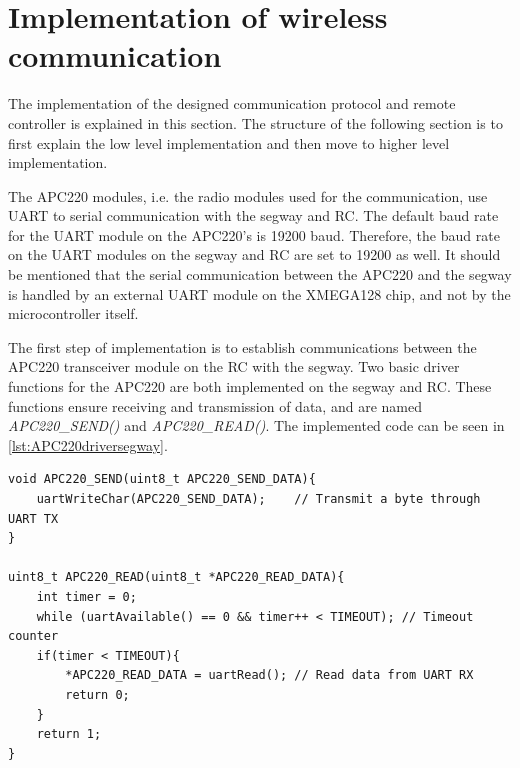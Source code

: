 %
\newpage
\section{Implementation of wireless communication}
The implementation of the designed communication protocol and remote controller is explained in this section. The structure of the following section is to first explain the low level implementation and then move to higher level implementation.%
 
The APC220 modules, i.e. the radio modules used for the communication, use UART to serial communication with the segway and RC. The default baud rate for the UART module on the APC220's is 19200 baud. Therefore, the baud rate on the UART modules on the segway and RC are set to 19200 as well. It should be mentioned that the serial communication between the APC220 and the segway is handled by an external UART module on the XMEGA128 chip, and not by the microcontroller itself. 

The first step of implementation is to establish communications between the APC220 transceiver module on the RC with the segway. Two basic driver functions for the APC220 are both implemented on the segway and RC. These functions ensure receiving and transmission of data, and are named \textit{APC220\_SEND()} and \textit{APC220\_READ()}. %
The implemented code can be seen in \autoref{lst:APC220driversegway}.

\begin{lstlisting}
void APC220_SEND(uint8_t APC220_SEND_DATA){
	uartWriteChar(APC220_SEND_DATA);	// Transmit a byte through UART TX
}

uint8_t APC220_READ(uint8_t *APC220_READ_DATA){
	int timer = 0;
	while (uartAvailable() == 0 && timer++ < TIMEOUT); // Timeout counter
	if(timer < TIMEOUT){
		*APC220_READ_DATA = uartRead();	// Read data from UART RX
		return 0;	
	}
	return 1;
}
\end{lstlisting}

